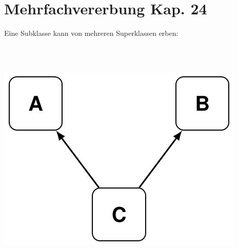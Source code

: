 \begin{minipage}[t]{0.49\textwidth}
	\section[Mehrfachvererbung]{Mehrfachvererbung \tiny{Kap. 24}}
	Eine Subklasse kann von mehreren Superklassen erben:\\
	\begin{minipage}[t]{0.54\textwidth}
		
	\end{minipage}
	\begin{minipage}[t]{0.02\textwidth}$\quad$\end{minipage}
	\begin{minipage}[t]{0.4\textwidth}
			$\quad$\\[18pt]
			\includegraphics[width=\textwidth]{images/v7_vererbung2}
	\end{minipage}
	

\end{minipage}
